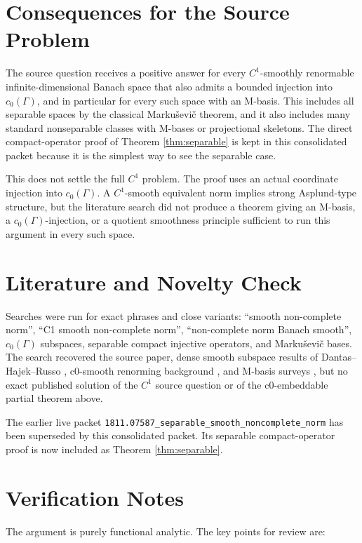 \documentclass[11pt]{article}
\theoremstyle{definition}
\begin{document}
\section*{Consequences for the Source Problem}

The source question receives a positive answer for every \(C^1\)-smoothly
renormable infinite-dimensional Banach space that also admits a bounded
injection into \(c_0(\Gamma)\), and in particular for every such space with an
M-basis.  This includes all separable spaces by the classical Marku\v{s}evi\v{c}
theorem, and it also includes many standard nonseparable classes with M-bases
or projectional skeletons.  The direct compact-operator proof of
Theorem \ref{thm:separable} is kept in this consolidated packet because it is
the simplest way to see the separable case.

This does not settle the full \(C^1\) problem.  The proof uses an actual
coordinate injection into \(c_0(\Gamma)\).  A \(C^1\)-smooth equivalent norm
implies strong Asplund-type structure, but the literature search did not
produce a theorem giving an M-basis, a \(c_0(\Gamma)\)-injection, or a quotient
smoothness principle sufficient to run this argument in every such space.

\section*{Literature and Novelty Check}

Searches were run for exact phrases and close variants: ``smooth non-complete
norm'', ``C1 smooth non-complete norm'', ``non-complete norm Banach smooth'',
\(c_0(\Gamma)\) subspaces, separable compact injective operators, and
Marku\v{s}evi\v{c} bases.  The search recovered the source paper, dense smooth
subspace results of Dantas--Hajek--Russo \cite{DHR}, c0-smooth renorming
background \cite{HT}, and M-basis surveys \cite{HRsurvey}, but no exact
published solution of the \(C^1\) source question or of the c0-embeddable
partial theorem above.

The earlier live packet
\texttt{1811.07587\_separable\_smooth\_noncomplete\_norm} has been superseded
by this consolidated packet.  Its separable compact-operator proof is now
included as Theorem \ref{thm:separable}.

\section*{Verification Notes}

The argument is purely functional analytic.  The key points for review are:
\end{document}
